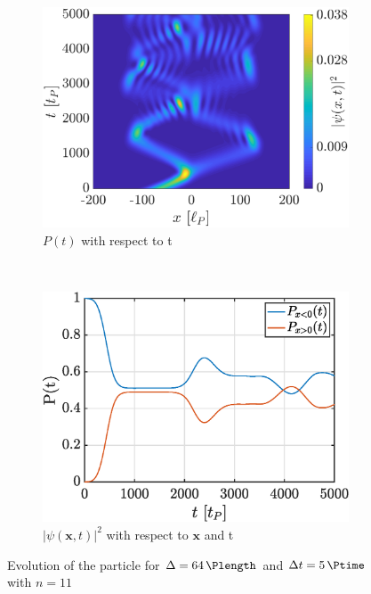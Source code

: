 \documentclass[a4paper,12pt,twoside]{article}
\newcommand{\mbf}[1]{\mathbf{#1}} %
\begin{document}
      \begin{figure}[h]
        \centering
        \begin{subfigure}[t]{0.45\textwidth}
          \includegraphics[width=\textwidth]{graphs/iii_findn_evo.eps}
          \caption{$P(t)$ with respect to t}
          \label{fig:iii_findn_evo}
        \end{subfigure}
        ~
        \begin{subfigure}[t]{0.45\textwidth}
          \includegraphics[width=\textwidth]{graphs/iii_findn_prob.eps}
          \caption{$|\psi(\mbf{x}, t)|^2$ with respect to $\mbf{x}$ and t}
          \label{fig:iii_findn_prob}
        \end{subfigure}
        \caption{Evolution of the particle for $\Delta = \SI{64}{\Plength}$ and $\Delta t = \SI{5}{\Ptime}$ with $n=11$}
        \label{fig:iii_findn}
      \end{figure}
\end{document}
